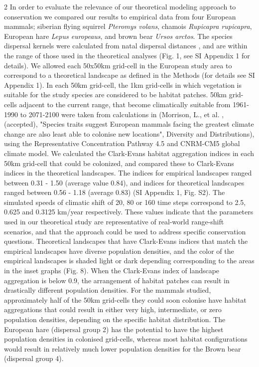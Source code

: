 \documentclass[12pt,pdftex]{article}
\begin{document}
\begin{spacing}{2}
In order to evaluate the relevance of our theoretical modeling approach to conservation we compared our results to empirical data from four European mammals; siberian flying squirrel {\em Pteromys volans}, chamois {\em Rupicapra rupicapra}, European hare {\em Lepus europeaus}, and brown bear {\em Ursos arctos}.  The species dispersal kernels were calculated from natal dispersal distances \citep{Whitmee2013}, and are within the range of those used in the theoretical analyses  (Fig. 1, see SI Appendix 1 for details).  We allowed each 50x50km grid-cell in the European study area to correspond to a theoretical landscape as defined in the Methods (for details see SI Appendix 1). In each 50km grid-cell, the 1km grid-cells in which vegetation is suitable for the study species are considered to be habitat patches. 50km grid-cells adjacent to the current range, that become climatically suitable from 1961-1990 to 2071-2100 were taken from calculations in (Morrison, L., et al. , (accepted), "Species traits suggest European mammals facing the greatest climate change are also least able to colonise new locations", Diversity and Distributions), using the Representative Concentration Pathway 4.5 and CNRM-CM5 global climate model.  We calculated the Clark-Evans habitat aggregation indices \citep{Clark1954} in each 50km grid-cell that could be colonized, and compared these to Clark-Evans indices in the theoretical landscapes. The indices for empirical landscapes ranged between 0.31 - 1.50 (average value 0.84), and indices for theoretical landscapes ranged between 0.56 - 1.18 (average 0.83) (SI Appendix 1, Fig. S2). The simulated speeds of climatic shift of 20, 80 or 160 time steps correspond to 2.5, 0.625 and 0.3125 km/year respectively.  These values indicate that the parameters used in our theoretical study are representative of real-world range-shift scenarios, and that the approach could be used to address specific conservation questions. Theoretical landscapes that have Clark-Evans indices that match the empirical landscapes have diverse population densities, and the color of the empirical landscapes is shaded light or dark depending corresponding to the areas in the inset graphs (Fig. 8). When the Clark-Evans index of landscape aggregation is below 0.9, the arrangement of habitat patches can result in drastically different population densities.  For the mammals studied, approximately half of the 50km grid-cells they could soon colonise have habitat aggregations that could result in either very high, intermediate, or zero population densities, depending on the specific habitat distribution. The European hare (dispersal group 2) has the potential to have the highest population densities in colonised grid-cells, whereas most habitat configurations would result in relatively much lower population densities for the Brown bear (dispersal group 4). 


\end{spacing}
\end{document}
